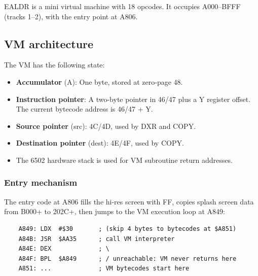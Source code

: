 \documentclass[10pt]{report}
\begin{document}
{\Tt{}EALDR\nwendquote} is a mini virtual machine with 18 opcodes. It occupies {\Tt{}{\$}A000\nwendquote}--{\Tt{}{\$}BFFF\nwendquote}
(tracks 1--2), with the entry point at {\Tt{}{\$}A806\nwendquote}.

\subsection{VM architecture}

The VM has the following state:

\begin{itemize}
  \item \textbf{Accumulator} ({\Tt{}A\nwendquote}): One byte, stored at zero-page {\Tt{}{\$}48\nwendquote}.
  \item \textbf{Instruction pointer}: A two-byte pointer in {\Tt{}{\$}46\nwendquote}/{\Tt{}{\$}47\nwendquote} plus
        a {\Tt{}Y\nwendquote} register offset. The current bytecode address is {\Tt{}{\$}46\nwendquote}/{\Tt{}{\$}47\nwendquote} + {\Tt{}Y\nwendquote}.
  \item \textbf{Source pointer} ({\Tt{}src\nwendquote}): {\Tt{}{\$}4C\nwendquote}/{\Tt{}{\$}4D\nwendquote}, used by {\Tt{}DXR\nwendquote} and {\Tt{}COPY\nwendquote}.
  \item \textbf{Destination pointer} ({\Tt{}dest\nwendquote}): {\Tt{}{\$}4E\nwendquote}/{\Tt{}{\$}4F\nwendquote}, used by {\Tt{}COPY\nwendquote}.
  \item The 6502 hardware stack is used for VM subroutine return addresses.
\end{itemize}

\subsubsection{Entry mechanism}

The entry code at {\Tt{}{\$}A806\nwendquote} fills the hi-res screen with {\Tt{}{\$}FF\nwendquote}, copies
splash screen data from {\Tt{}{\$}B000\nwendquote}+ to {\Tt{}{\$}202C\nwendquote}+, then jumps to the VM
execution loop at {\Tt{}{\$}A849\nwendquote}:

\begin{verbatim}
    A849: LDX  #$30       ; (skip 4 bytes to bytecodes at $A851)
    A84B: JSR  $AA35      ; call VM interpreter
    A84E: DEX             ; \
    A84F: BPL  $A849      ; / unreachable: VM never returns here
    A851: ...             ; VM bytecodes start here
\end{verbatim}
\end{document}
